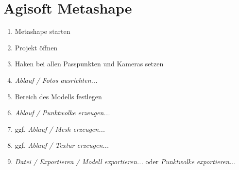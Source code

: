 \documentclass[./00PhotoBox.tex]{subfiles}
\begin{document}
\section{Agisoft Metashape}
\begin{enumerate}
    \item Metashape starten
    \item Projekt öffnen
    \item Haken bei allen Passpunkten und Kameras setzen
    \item \textit{Ablauf / Fotos ausrichten...}
    \item Bereich des Modells festlegen
    \item \textit{Ablauf / Punktwolke erzeugen...}
    \item ggf. \textit{Ablauf / Mesh erzeugen...}
    \item ggf. \textit{Ablauf / Textur erzeugen...}
    \item \textit{Datei / Exportieren / Modell exportieren...} oder \textit{Punktwolke exportieren...}
\end{enumerate}

\biblio
\end{document}
